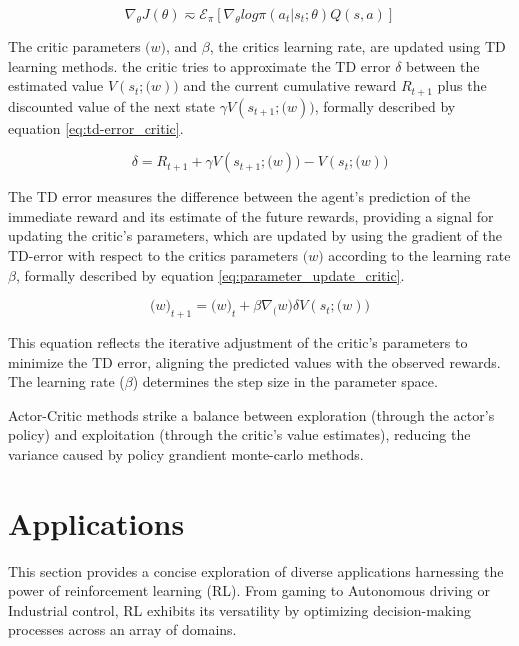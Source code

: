 \begin{equation}
    \label{eq:gradient_actor_critic}
    \nabla_\theta J(\theta) \eqsim \mathcal{E}_\pi[\nabla_\theta log \pi(a_t|s_t;\theta)Q(s,a)]
\end{equation}

The critic parameters $\mathcal(w)$, and $\beta$, the critics learning rate, are updated using TD learning methods. the critic tries to approximate the TD error $\delta$ between the estimated value $V(s_t;\mathcal(w))$ and the current cumulative reward $R_{t+1}$ plus the discounted value of the next state $\gamma V(s_{t+1};\mathcal(w))$, formally described by equation \ref{eq:td-error_critic}.

\begin{equation}
    \label{eq:td-error_critic}
    \delta = R_{t+1} + \gamma V(s_{t+1};\mathcal(w)) - V(s_t;\mathcal(w))
\end{equation}

The TD error measures the difference between the agent's prediction of the immediate reward and its estimate of the future rewards, providing a signal for updating the critic's parameters, which are updated by using the gradient of the TD-error with respect to the critics parameters $\mathcal(w)$ according to the learning rate $\beta$, formally described by equation \ref{eq:parameter_update_critic}.

\begin{equation}
    \label{eq:parameter_update_critic}
    \mathcal(w)_{t+1} = \mathcal(w)_t + \beta \nabla_\mathcal(w) \delta V(s_t;\mathcal(w))
\end{equation}

This equation reflects the iterative adjustment of the critic's parameters to minimize the TD error, aligning the predicted values with the observed rewards. The learning rate ($\beta$) determines the step size in the parameter space.

Actor-Critic methods strike a balance between exploration (through the actor's policy) and exploitation (through the critic's value estimates), reducing the variance caused by policy grandient monte-carlo methods.

\section{Applications}\label{sec:rl-applications}
This section provides a concise exploration of diverse applications harnessing the power of reinforcement learning (RL). From gaming to Autonomous driving or Industrial control, RL exhibits its versatility by optimizing decision-making processes across an array of domains.

